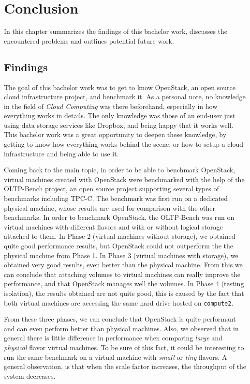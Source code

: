 

\chapter{Conclusion}
In this chapter summarizes the findings of this bachelor work, discusses the encountered problems and outlines potential future work.


\section{Findings}
The goal of this bachelor work was to get to know OpenStack, an open source cloud infrastructure project, and benchmark it.
As a personal note, no knowledge in the field of \textit{Cloud Computing} was there beforehand, especially in how everything works in details.
The only knowledge was those of an end-user just using data storage services like Dropbox, and being happy that it works well.
This bachelor work was a great opportunity to deepen these knowledge, by getting to know how everything works behind the scene, or how to setup a cloud infrastructure and being able to use it.

Coming back to the main topic, in order to be able to benchmark OpenStack, virtual machines created with OpenStack were benchmarked with the help of the OLTP-Bench project, an open source project supporting several types of benchmarks including TPC-C.
The benchmark was first run on a dedicated physical machine, whose results are used for comparison with the other benchmarks.
In order to benchmark OpenStack, the OLTP-Bench was run on virtual machines with different flavors and with or without logical storage attached to them.
In Phase 2 (virtual machines without storage), we obtained quite good performance results, but OpenStack could not outperform the the physical machine from Phase 1.
In Phase 3 (virtual machines with storage), we obtained very good results, even better than the physical machine.
From this we can conclude that attaching volumes to virtual machines can really improve the performance, and that OpenStack manages well the volumes.
In Phase 4 (testing isolation), the results obtained are not quite good, this is caused by the fact that both virtual machines are accessing the same hard drive hosted on \texttt{compute2}.

From these three phases, we can conclude that OpenStack is quite performant and can even perform better than physical machines.
Also, we observed that in general there is little difference in performance when comparing \textit{large} and \textit{physical} flavor virtual machines.
To be sure of this fact, it could be interesting to run the same benchmark on a virtual machine with \textit{small} or \textit{tiny} flavors.
A general observation, is that when the scale factor increases, the throughput of the system decreases.

